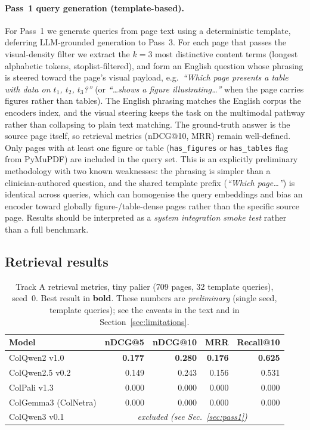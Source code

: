 \documentclass[10pt,a4paper]{article}
\begin{document}
\paragraph{Pass~1 query generation (template-based).}
\label{sec:mock-queries}
For Pass~1 we generate queries from page text using a deterministic template,
deferring LLM-grounded generation to Pass~3. For each page that passes the visual-density filter
we extract the $k=3$ most distinctive content terms (longest alphabetic
tokens, stoplist-filtered), and form an English question whose phrasing is
steered toward the page's visual payload, e.g.\
\textit{``Which page presents a table with data on $t_1$, $t_2$, $t_3$?''}
(or \textit{``\ldots{}shows a figure illustrating\ldots''} when the page
carries figures rather than tables). The English phrasing matches the
English corpus the encoders index, and the visual steering keeps the task on
the multimodal pathway rather than collapsing to plain text matching.
The ground-truth answer is the source page itself, so retrieval metrics
(nDCG@10, MRR) remain well-defined. Only pages with at least one figure or
table (\texttt{has\_figures} or \texttt{has\_tables} flag from PyMuPDF) are
included in the query set. This is an explicitly preliminary methodology with
two known weaknesses: the phrasing is simpler than a clinician-authored
question, and the shared template prefix (\textit{``Which page\ldots''}) is
identical across queries, which can homogenise the query embeddings and bias
an encoder toward globally figure-/table-dense pages rather than the specific
source page. Results should be interpreted as a \emph{system integration
smoke test} rather than a full benchmark.

\subsection{Retrieval results}

\begin{table}[h]
  \centering
  \caption{Track A retrieval metrics, tiny palier (709 pages, 32 template
    queries), seed~0. Best result in \textbf{bold}. These numbers are
    \emph{preliminary} (single seed, template queries); see the caveats in
    the text and in Section~\ref{sec:limitations}.}
  \label{tab:track_a_retrieval}
  \begin{tabular}{lrrrr}
    \toprule
    Model & nDCG@5 & nDCG@10 & MRR & Recall@10 \\
    \midrule
    ColQwen2 v1.0        & \textbf{0.177} & \textbf{0.280} & \textbf{0.176} & \textbf{0.625} \\
    ColQwen2.5 v0.2      & 0.149 & 0.243 & 0.156 & 0.531 \\
    ColPali v1.3         & 0.000 & 0.000 & 0.000 & 0.000 \\
    ColGemma3 (ColNetra) & 0.000 & 0.000 & 0.000 & 0.000 \\
    ColQwen3 v0.1        & \multicolumn{4}{c}{\textit{excluded (see Sec.~\ref{sec:pass1})}} \\
    \bottomrule
  \end{tabular}
\end{table}
\end{document}
